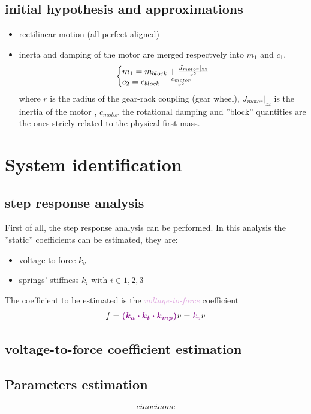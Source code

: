 \documentclass[twosided,a4paper]{article}           %
\makeatletter
\newenvironment{sistema}%
{\left\lbrace\begin{array}{@{}l@{}}}%
	{\end{array}\right.}
\makeatother
\begin{document}
\subsection{initial hypothesis and approximations}
\begin{itemize}
	\item rectilinear motion (all perfect aligned)
	\item inerta and damping of the motor are merged respectvely into $m_1$ and $c_1$.
	\begin{equation}
	\begin{sistema}
		m_1 = m_{block} + \frac{J_{motor}\vert_{zz}}{r^2}\\
		c_2 = c_{block} + \frac{c_{motor}}{r^2}
	\end{sistema}
	\end{equation}
	where $r$ is the radius of the gear-rack coupling (gear wheel), $J_{motor}\vert_{zz}$ is the inertia of the motor , $c_{motor}$ the rotational damping and ''block'' quantities are the ones stricly related to the physical first mass.
\end{itemize}
\section{System identification}
	
\subsection{step response analysis}
First of all, the step response analysis can be performed. In this analysis the ''static'' coefficients can be estimated, they are:
\begin{itemize}
	\item voltage to force $k_v$
	\item springs' stiffness $k_i$ with $i \in 1,2,3$
\end{itemize} 
The coefficient to be estimated is the \textcolor{Plum}{\textit{voltage-to-force}} coefficient %
\begin{equation}
	f = \textcolor{Plum}{\bm{(k_a\cdot k_t \cdot k_{mp})}}v = \textcolor{Plum}{k_v} v
\end{equation}
\subsection{voltage-to-force coefficient estimation}

\subsection{Parameters estimation}

\begin{subequations}
\begin{equation}
	ciao
\end{equation}
\begin{equation}
	ciaone
\end{equation}
\end{subequations}
\end{document}
